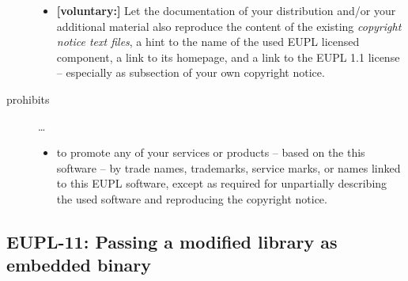 \begin{description}
\begin{itemize}
  \item \textbf{[voluntary:]} Let the documentation of your distribution and/or
  your additional material  also reproduce the content of the existing
  \emph{copyright notice text files}, a hint to the name of the used EUPL
  licensed component, a link to its homepage, and a link to the EUPL 1.1 license
  -- especially as subsection of your own copyright notice.
 
\end{itemize}

\item[prohibits] \ldots
\begin{itemize}
  \item to promote any of your services or products -- based on the this software
  -- by trade names, trademarks, service marks, or names linked to this EUPL
  software, except as required for unpartially describing the used software and
  reproducing the copyright notice.
\end{itemize}

\end{description}


\subsection{EUPL-11: Passing a modified library as embedded binary}
\label{OSUC-10B-EUPL}

